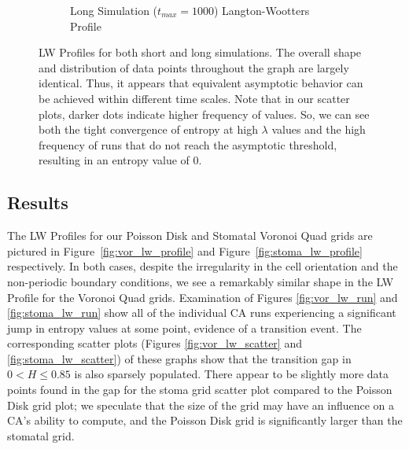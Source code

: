 \documentclass[a4paper,11pt]{article}
\begin{document}
\begin{figure}[htp]
\begin{subfigure}[t]{0.65\textwidth}
  \caption{Long Simulation ($t_{max} = 1000$) Langton-Wootters Profile}
  \label{fig:lw_profile_long}
  \end{subfigure}
\caption[Langton-Wootters Profile for Short and Long Simulations]{
  LW Profiles for both short and long simulations. The overall shape and distribution of data points throughout the graph are largely identical. Thus, it appears that equivalent asymptotic behavior can be achieved within different time scales. Note that in our scatter plots, darker dots indicate higher frequency of values. So, we can see both the tight convergence of entropy at high $\lambda$ values and the high frequency of runs that do not reach the asymptotic threshold, resulting in an entropy value of 0.
}
\label{fig:lw_reg_short_long}
\end{figure}

\subsection*{Results}

The LW Profiles for our Poisson Disk and Stomatal Voronoi Quad grids are pictured in Figure~\ref{fig:vor_lw_profile} and Figure~\ref{fig:stoma_lw_profile} respectively. In both cases, despite the irregularity in the cell orientation and the non-periodic boundary conditions, we see a remarkably similar shape in the LW Profile for the Voronoi Quad grids. Examination of Figures \ref{fig:vor_lw_run} and \ref{fig:stoma_lw_run} show all of the individual CA runs experiencing a significant jump in entropy values at some point, evidence of a transition event. The corresponding scatter plots (Figures \ref{fig:vor_lw_scatter} and \ref{fig:stoma_lw_scatter}) of these graphs show that the transition gap in $0 < H \le 0.85$ is also sparsely populated. There appear to be slightly more data points found in the gap for the stoma grid scatter plot compared to the Poisson Disk grid plot; we speculate that the size of the grid may have an influence on a CA's ability to compute, and the Poisson Disk grid is significantly larger than the stomatal grid. 
\end{document}
